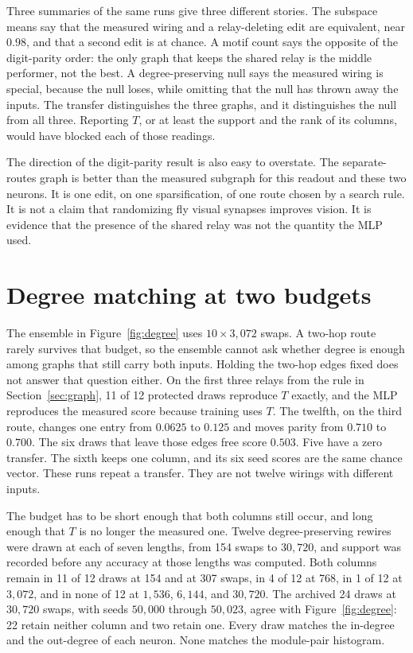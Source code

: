 \documentclass[10pt,twocolumn,letterpaper]{article}
\begin{document}
Three summaries of the same runs give three different stories.
The subspace means say that the measured wiring and a relay-deleting edit are equivalent, near $0.98$, and that a second edit is at chance.
A motif count says the opposite of the digit-parity order: the only graph that keeps the shared relay is the middle performer, not the best.
A degree-preserving null says the measured wiring is special, because the null loses, while omitting that the null has thrown away the inputs.
The transfer distinguishes the three graphs, and it distinguishes the null from all three.
Reporting $T$, or at least the support and the rank of its columns, would have blocked each of those readings.

The direction of the digit-parity result is also easy to overstate.
The separate-routes graph is better than the measured subgraph for this readout and these two neurons.
It is one edit, on one sparsification, of one route chosen by a search rule.
It is not a claim that randomizing fly visual synapses improves vision.
It is evidence that the presence of the shared relay was not the quantity the MLP used.


\section{Degree matching at two budgets}
\label{sec:routes}

The ensemble in Figure~\ref{fig:degree} uses $10\times 3{,}072$ swaps.
A two-hop route rarely survives that budget, so the ensemble cannot ask whether degree is enough among graphs that still carry both inputs.
Holding the two-hop edges fixed does not answer that question either.
On the first three relays from the rule in Section~\ref{sec:graph}, 11 of 12 protected draws reproduce $T$ exactly, and the MLP reproduces the measured score because training uses $T$.
The twelfth, on the third route, changes one entry from $0.0625$ to $0.125$ and moves parity from $0.710$ to $0.700$.
The six draws that leave those edges free score $0.503$.
Five have a zero transfer.
The sixth keeps one column, and its six seed scores are the same chance vector.
These runs repeat a transfer.
They are not twelve wirings with different inputs.

The budget has to be short enough that both columns still occur, and long enough that $T$ is no longer the measured one.
Twelve degree-preserving rewires were drawn at each of seven lengths, from 154 swaps to $30{,}720$, and support was recorded before any accuracy at those lengths was computed.
Both columns remain in 11 of 12 draws at 154 and at 307 swaps, in 4 of 12 at 768, in 1 of 12 at $3{,}072$, and in none of 12 at $1{,}536$, $6{,}144$, and $30{,}720$.
The archived 24 draws at $30{,}720$ swaps, with seeds $50{,}000$ through $50{,}023$, agree with Figure~\ref{fig:degree}: 22 retain neither column and two retain one.
Every draw matches the in-degree and the out-degree of each neuron.
None matches the module-pair histogram.
\end{document}
